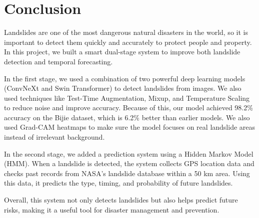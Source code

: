 \documentclass[11pt,a4paper]{article}
\begin{document}
\section{Conclusion}
Landslides are one of the most dangerous natural disasters in the world, so it is important to detect them quickly and accurately to protect people and property. In this project, we built a smart dual-stage system to improve both landslide detection and temporal forecasting.

In the first stage, we used a combination of two powerful deep learning models (ConvNeXt and Swin Transformer) to detect landslides from images. We also used techniques like Test-Time Augmentation, Mixup, and Temperature Scaling to reduce noise and improve accuracy. Because of this, our model achieved 98.2\% accuracy on the Bijie dataset, which is 6.2\% better than earlier models. We also used Grad-CAM heatmaps to make sure the model focuses on real landslide areas instead of irrelevant background.

In the second stage, we added a prediction system using a Hidden Markov Model (HMM). When a landslide is detected, the system collects GPS location data and checks past records from NASA’s landslide database within a 50 km area. Using this data, it predicts the type, timing, and probability of future landslides.

Overall, this system not only detects landslides but also helps predict future risks, making it a useful tool for disaster management and prevention.
\end{document}
